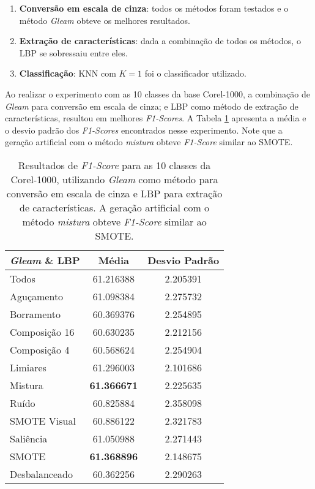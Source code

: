\begin{enumerate}
\item \textbf{Conversão em escala de cinza}: todos os métodos foram testados e o método \textit{Gleam} obteve os melhores resultados.

\item \textbf{Extração de características}: dada a combinação de todos os métodos, o LBP se sobressaiu entre eles.

\item \textbf{Classificação}: KNN com $K=1$ foi o classificador utilizado.
\end{enumerate}


Ao realizar o experimento com as 10 classes da base Corel-1000, a combinação de \emph{Gleam} para conversão em escala de cinza; e LBP como método de extração de características, resultou em melhores \textit{F1-Scores}. A Tabela \ref{tab:resultados:3.1} apresenta a média e o desvio padrão dos \textit{F1-Scores} encontrados nesse experimento. Note que a geração artificial com o método \emph{mistura} obteve \textit{F1-Score} similar ao SMOTE.

\begin{table}[!htbp]
\begin{center}
\caption{Resultados de \textit{F1-Score} para as 10 classes da Corel-1000, utilizando \emph{Gleam} como método para conversão em escala de cinza e LBP para extração de características. A geração artificial com o método \emph{mistura} obteve \textit{F1-Score} similar ao SMOTE.}
\label{tab:resultados:3.1}
\begin{tabular}{|l|c|c|}
\hline
\textbf{\emph{Gleam} \& LBP} & \textbf{Média}     & \textbf{Desvio Padrão} \\ \hline
   Todos        &  61.216388 &  2.205391  \\ \hline
  Aguçamento    &  61.098384 &  2.275732  \\ \hline
  Borramento    &  60.369376 &  2.254895  \\ \hline
  Composição 16 &  60.630235 &  2.212156  \\ \hline
  Composição 4  &  60.568624 &  2.254904  \\ \hline
  Limiares      &  61.296003 &  2.101686  \\ \hline
  Mistura       &  \textbf{61.366671} &  2.225635  \\ \hline
  Ruído         &  60.825884 &  2.358098  \\ \hline
  SMOTE Visual  &  60.886122 &  2.321783  \\ \hline
  Saliência     &  61.050988 &  2.271443  \\ \hline
 SMOTE          &  \textbf{61.368896} &  2.148675  \\ \hline
Desbalanceado   &  60.362256 &  2.290263  \\ \hline
\end{tabular}
\end{center}
\end{table}

